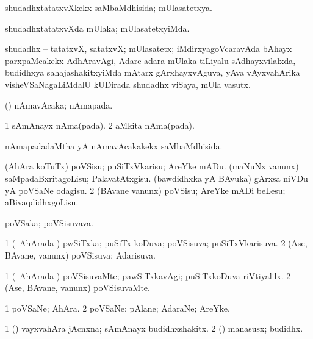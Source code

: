 \bentry
{}
\gl{\gu}
\bmng
shudadhxtatatxvXkekx saMbaMdhisida; mUlasatetxya. 
\emng
\eentry

\bentry
{}
\gl{\kirxvi}
\bmng
shudadhxtatatxvXda mUlaka; mUlasatetxyiMda. 
\emng
\eentry

\bentry
{}
\gl{\nA}
\bmng
shudadhx -- tatatxvX, satatxvX; mUlasatetx; iMdirxyagoVcaravAda bAhayx parxpaMcakekx AdhAravAgi, Adare adara mUlaka tiLiyalu sAdhayxvilalxda, budidhxya sahajashakitxyiMda mAtarx gArxhayxvAguva, yAva vAyxvahArika visheVSaNagaLiMdalU kUDirada shudadhx viSaya, mUla vasutx. 
\emng
\eentry

\bentry
{}
\gl{\nA}
\bmng
(\vAyx) nAmavAcaka; nAmapada. 
\emng

\noindent
\gl{\pagu}
\bmng
\bnum
\num{1}  sAmAnayx nAma(pada). 
\num{2}  aMkita nAma(pada). 
\enum
\emng
\eentry

\bentry
{}
\gl{\gu}
\bmng
nAmapadadaMtha yA nAmavAcakakekx saMbaMdhisida. 
\emng
\eentry

\bentry
{}
\gl{\sakirx}
\bmng
\bnum
{} 
\banum
{} (AhAra koTuTx) poVSisu; puSiTxVkarisu; AreYke mADu. 
 (maNuNx \mo vanunx) saMpadaBxritagoLisu; PalavatAtxgisu. 
 (bawdidhxka yA BAvuka) gArxsa niVDu yA poVSaNe odagisu. 
\eanum
\numie
\num{2} (BAvane \mo vanunx) poVSisu; AreYke mADi beLesu; aBivaqdidhxgoLisu. 
\enum
\emng
\eentry

\bentry
{}
\gl{\nA}
\bmng
poVSaka; poVSisuvava. 
\emng
\eentry

\bentry
{}
\gl{\gu}
\bmng
\bnum
\num{1} (\kanmu\ AhArada \vi) pwSiTxka; puSiTx koDuva; poVSisuva; puSiTxVkarisuva. 
\num{2} (Ase, BAvane, \mo vanunx) poVSisuva; Adarisuva. 
\enum
\emng
\eentry

\bentry
{}
\gl{\kirxvi}
\bmng
\bnum
\num{1} (\kanmu\ AhArada \vi) poVSisuvaMte; pawSiTxkavAgi; puSiTxkoDuva riVtiyalilx. 
\num{2} (Ase, BAvane, \mo vanunx) poVSisuvaMte. 
\enum
\emng
\eentry

\bentry
{}
\gl{\nA}
\bmng
\bnum
\num{1} poVSaNe; AhAra. 
\num{2} poVSaNe; pAlane; AdaraNe; AreYke. 
\enum
\emng
\eentry

\bentry
{}
\gl{\nA}
\bmng
\bnum
\num{1} (\AmA) vayxvahAra jAcnxna; sAmAnayx budidhxshakitx. 
\num{2} (\tashA) manasusx; budidhx. 
\enum
\emng
\eentry

